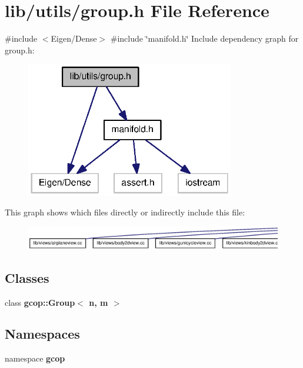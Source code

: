 \section{lib/utils/group.h \-File \-Reference}
\label{group_8h}
{\ttfamily \#include $<$\-Eigen/\-Dense$>$}\*
{\ttfamily \#include \char`\"{}manifold.\-h\char`\"{}}\*
\-Include dependency graph for group.\-h\-:\nopagebreak
\begin{figure}[H]
\begin{center}
\leavevmode
\includegraphics[width=258pt]{group_8h__incl}
\end{center}
\end{figure}
\-This graph shows which files directly or indirectly include this file\-:
\nopagebreak
\begin{figure}[H]
\begin{center}
\leavevmode
\includegraphics[width=350pt]{group_8h__dep__incl}
\end{center}
\end{figure}
\subsection*{\-Classes}
\begin{DoxyCompactItemize}
\item 
class {\bf gcop\-::\-Group$<$ n, m $>$}
\end{DoxyCompactItemize}
\subsection*{\-Namespaces}
\begin{DoxyCompactItemize}
\item 
namespace {\bf gcop}
\end{DoxyCompactItemize}
